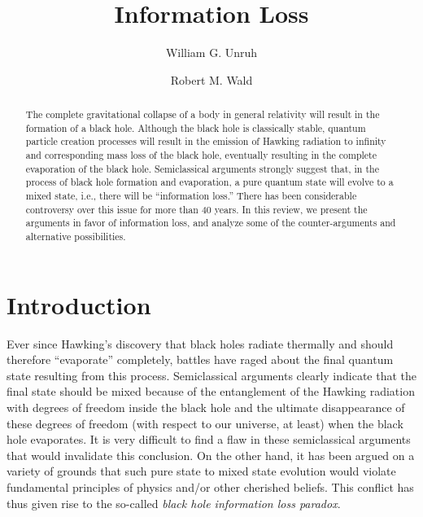 \documentclass[12pt,nofootinbib,amsmath,amssymb,amsfonts,aps,prd,groupedaddress]{revtex4-1}
\begin{document}
\title{Information Loss}

\author{William G. Unruh}


\author{Robert M. Wald}




\begin{abstract}

The complete gravitational collapse of a body in general relativity will result
in the formation of a black hole. Although the black hole is classically stable,
quantum particle creation processes will result in the emission of Hawking
radiation to infinity and corresponding mass loss of the black hole, eventually
resulting in the complete evaporation of the black hole. Semiclassical arguments
strongly suggest that, in the process of black hole formation and evaporation, a
pure quantum state will evolve to a mixed state, i.e., there will be
``information loss.'' There has been considerable controversy over this issue
for more than 40 years. In this review, we present the arguments in favor of
information loss, and analyze some of the counter-arguments and alternative
possibilities.

\end{abstract}


\maketitle


\section{Introduction}

Ever since Hawking's discovery \cite{hawk} that black holes radiate thermally and
should therefore ``evaporate'' completely, battles have raged about the final
quantum state resulting from this process.  Semiclassical arguments clearly
indicate that the final state should be mixed because of the entanglement of the
Hawking radiation with degrees of freedom inside the black hole and the ultimate
disappearance of these degrees of freedom (with respect to our universe, at
least) when the black hole evaporates. It is very difficult to find a flaw in
these semiclassical arguments that would invalidate this conclusion. On the
other hand, it has been argued on a variety of grounds that such pure state to
mixed state evolution would violate fundamental principles of physics and/or
other cherished beliefs. This conflict has thus given rise to the so-called {\it
black hole information loss paradox}. 
\end{document}
